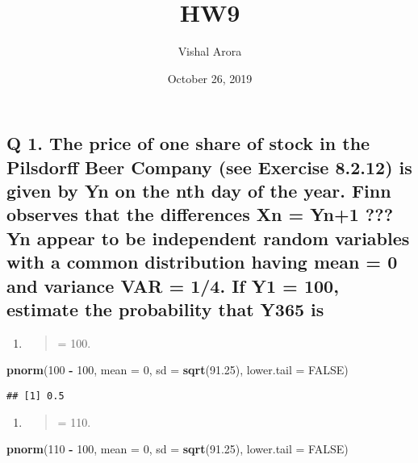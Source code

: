 \documentclass[]{article}
\title{HW9}
\author{Vishal Arora}
\date{October 26, 2019}
\newenvironment{Shaded}{\begin{snugshade}}{\end{snugshade}}
\newcommand{\KeywordTok}[1]{\textcolor[rgb]{0.13,0.29,0.53}{\textbf{#1}}}
\newcommand{\DataTypeTok}[1]{\textcolor[rgb]{0.13,0.29,0.53}{#1}}
\newcommand{\DecValTok}[1]{\textcolor[rgb]{0.00,0.00,0.81}{#1}}
\newcommand{\FloatTok}[1]{\textcolor[rgb]{0.00,0.00,0.81}{#1}}
\newcommand{\StringTok}[1]{\textcolor[rgb]{0.31,0.60,0.02}{#1}}
\newcommand{\OtherTok}[1]{\textcolor[rgb]{0.56,0.35,0.01}{#1}}
\newcommand{\OperatorTok}[1]{\textcolor[rgb]{0.81,0.36,0.00}{\textbf{#1}}}
\newcommand{\NormalTok}[1]{#1}
\begin{document}
\maketitle

\subsection{Q 1. The price of one share of stock in the Pilsdorff Beer
Company (see Exercise 8.2.12) is given by Yn on the nth day of the year.
Finn observes that the differences Xn = Yn+1 ??? Yn appear to be
independent random variables with a common distribution having mean = 0
and variance VAR = 1/4. If Y1 = 100, estimate the probability that Y365
is}\label{q-1.-the-price-of-one-share-of-stock-in-the-pilsdorff-beer-company-see-exercise-8.2.12-is-given-by-yn-on-the-nth-day-of-the-year.-finn-observes-that-the-differences-xn-yn1-yn-appear-to-be-independent-random-variables-with-a-common-distribution-having-mean-0-and-variance-var-14.-if-y1-100-estimate-the-probability-that-y365-is}

\begin{enumerate}
\def\labelenumi{(\alph{enumi})}
\item
  \begin{quote}
  = 100.
  \end{quote}
\end{enumerate}

\begin{Shaded}
\begin{Highlighting}[]
\KeywordTok{pnorm}\NormalTok{(}\DecValTok{100} \OperatorTok{-}\StringTok{ }\DecValTok{100}\NormalTok{, }\DataTypeTok{mean =} \DecValTok{0}\NormalTok{, }\DataTypeTok{sd =} \KeywordTok{sqrt}\NormalTok{(}\FloatTok{91.25}\NormalTok{), }\DataTypeTok{lower.tail =} \OtherTok{FALSE}\NormalTok{)}
\end{Highlighting}
\end{Shaded}

\begin{verbatim}
## [1] 0.5
\end{verbatim}

\begin{enumerate}
\def\labelenumi{(\alph{enumi})}
\setcounter{enumi}{1}
\item
  \begin{quote}
  = 110.
  \end{quote}
\end{enumerate}

\begin{Shaded}
\begin{Highlighting}[]
\KeywordTok{pnorm}\NormalTok{(}\DecValTok{110} \OperatorTok{-}\StringTok{ }\DecValTok{100}\NormalTok{, }\DataTypeTok{mean =} \DecValTok{0}\NormalTok{, }\DataTypeTok{sd =} \KeywordTok{sqrt}\NormalTok{(}\FloatTok{91.25}\NormalTok{), }\DataTypeTok{lower.tail =} \OtherTok{FALSE}\NormalTok{)}
\end{Highlighting}
\end{Shaded}
\end{document}
